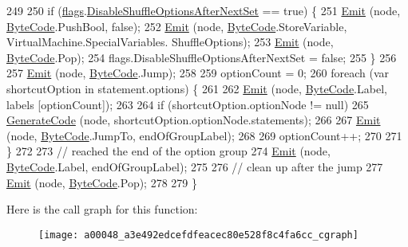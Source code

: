 \begin{DoxyCode}
249 
250             \textcolor{keywordflow}{if} (\hyperlink{a00048_a541022d89bcf9bc8f794eb6d6b438d08}{flags}.\hyperlink{a00048_a8b49bb7763ff477cba21d7c771ef3ed0}{DisableShuffleOptionsAfterNextSet} == \textcolor{keyword}{true}) \{
251                 \hyperlink{a00048_a774e8c143cdda0584fcfdda98626a83c}{Emit} (node, \hyperlink{a00045_ad5dfb6ee68ca7469623ad3e459f98894}{ByteCode}.PushBool, \textcolor{keyword}{false});
252                 \hyperlink{a00048_a774e8c143cdda0584fcfdda98626a83c}{Emit} (node, \hyperlink{a00045_ad5dfb6ee68ca7469623ad3e459f98894}{ByteCode}.StoreVariable, VirtualMachine.SpecialVariables.
      ShuffleOptions);
253                 \hyperlink{a00048_a774e8c143cdda0584fcfdda98626a83c}{Emit} (node, \hyperlink{a00045_ad5dfb6ee68ca7469623ad3e459f98894}{ByteCode}.Pop);
254                 flags.DisableShuffleOptionsAfterNextSet = \textcolor{keyword}{false};
255             \}
256 
257             \hyperlink{a00048_a774e8c143cdda0584fcfdda98626a83c}{Emit} (node, \hyperlink{a00045_ad5dfb6ee68ca7469623ad3e459f98894}{ByteCode}.Jump);
258 
259             optionCount = 0;
260             \textcolor{keywordflow}{foreach} (var shortcutOption \textcolor{keywordflow}{in} statement.options) \{
261 
262                 \hyperlink{a00048_a774e8c143cdda0584fcfdda98626a83c}{Emit} (node, \hyperlink{a00045_ad5dfb6ee68ca7469623ad3e459f98894}{ByteCode}.Label, labels [optionCount]);
263 
264                 \textcolor{keywordflow}{if} (shortcutOption.optionNode != null)
265                     \hyperlink{a00048_a006f3becd521cc179ba3d3352f6f930b}{GenerateCode} (node, shortcutOption.optionNode.statements);
266 
267                 \hyperlink{a00048_a774e8c143cdda0584fcfdda98626a83c}{Emit} (node, \hyperlink{a00045_ad5dfb6ee68ca7469623ad3e459f98894}{ByteCode}.JumpTo, endOfGroupLabel);
268 
269                 optionCount++;
270 
271             \}
272 
273             \textcolor{comment}{// reached the end of the option group}
274             \hyperlink{a00048_a774e8c143cdda0584fcfdda98626a83c}{Emit} (node, \hyperlink{a00045_ad5dfb6ee68ca7469623ad3e459f98894}{ByteCode}.Label, endOfGroupLabel);
275 
276             \textcolor{comment}{// clean up after the jump}
277             \hyperlink{a00048_a774e8c143cdda0584fcfdda98626a83c}{Emit} (node, \hyperlink{a00045_ad5dfb6ee68ca7469623ad3e459f98894}{ByteCode}.Pop);
278 
279         \}
\end{DoxyCode}


Here is the call graph for this function\-:
\nopagebreak
\begin{figure}[H]
\begin{center}
\leavevmode
\texttt{[image: a00048\_a3e492edcefdfeacec80e528f8c4fa6cc\_cgraph]}
\end{center}
\end{figure}


